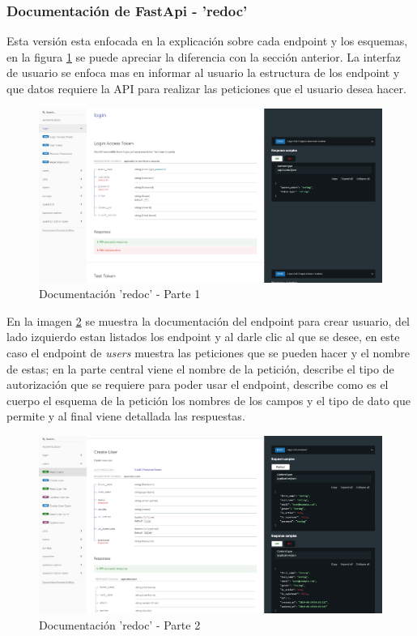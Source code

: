 \subsubsection{Documentación de FastApi - 'redoc'}
Esta versión esta enfocada en la explicación sobre cada endpoint y los esquemas, en la figura \ref{graphic:redoc1} se puede apreciar la diferencia con la sección anterior. La interfaz de usuario se enfoca mas en informar al usuario la estructura de los endpoint y que datos requiere la API para realizar las peticiones que el usuario desea hacer.

\begin{figure}[!htb]
    \centering
    \includegraphics[scale=.25]{TT/img/implementacion/redoc_1.png}
    \caption{Documentación 'redoc' - Parte 1}
    \label{graphic:redoc1}
\end{figure}

En la imagen \ref{graphic:redoc2} se muestra la documentación del endpoint para crear usuario, del lado izquierdo estan listados los endpoint y al darle clic al que se desee, en este caso el endpoint de \textit{users} muestra las peticiones que se pueden hacer y el nombre de estas; en la parte central viene el nombre de la petición, describe el tipo de autorización que se requiere para poder usar el endpoint, describe como es el cuerpo el esquema de la petición los nombres de los campos y el tipo de dato que permite y al final viene detallada las respuestas.
\begin{figure}[!htb]
    \centering
    \includegraphics[scale=.25]{TT/img/implementacion/redoc_2.png}
    \caption{Documentación 'redoc' - Parte 2}
    \label{graphic:redoc2}
\end{figure}

